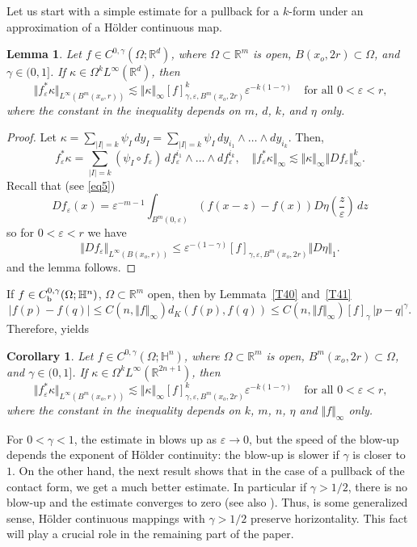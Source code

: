 \documentclass[intlimits,12pt,reqno]{amsart}
\newcommand{\bbbr}{\mathbb R}
\newcommand{\bbbh}{\mathbb H}
\newcommand{\R}{\mathbb R}
\newcommand{\eps}{\varepsilon}
\numberwithin{equation}{section}
\newtheorem{lemma}[theorem]{Lemma}
\newtheorem{corollary}[theorem]{Corollary}
\theoremstyle{definition}
\begin{document}
Let us start with a simple estimate for a pullback for a $k$-form under an approximation of a H\"older continuous map.
\begin{lemma}
\label{T8}
Let $f\in C^{0,\gamma}(\Omega;\bbbr^d)$, where $\Omega\subset\R^m$ is open, $B(x_o,2r)\subset\Omega$, and $\gamma\in(0,1]$.  
If $\kappa\in \Omega^k L^\infty(\bbbr^d)$, then 
$$
\Vert f_\eps^*\kappa\Vert_{L^\infty(B^m(x_o,r))}\lesssim \Vert\kappa\Vert_{\infty}[f]_{\gamma,\eps,B^m(x_o,2r)}^k \eps^{-k(1-\gamma)}
\quad
\text{for all $0<\eps<r$,}
$$
where the constant in the inequality depends on $m$, $d$, $k$, and $\eta$ only.
\end{lemma}
\begin{proof}
Let $\kappa=\sum_{|I|=k}\psi_I\, dy_I=\sum_{|I|=k}\psi_I\, dy_{i_1}\wedge\ldots\wedge dy_{i_k}$. Then,
$$
f_\eps^*\kappa = \sum_{|I|=k}(\psi_I\circ f_\eps)\, df_\eps^{i_1}\wedge\ldots\wedge df_\eps^{i_k},
\quad
\Vert f_\eps^*\kappa\Vert_\infty\lesssim \Vert\kappa\Vert_\infty\Vert Df_\eps\Vert_\infty^k.
$$
Recall that (see \eqref{eq5}) 
$$
D f_\eps(x) = \eps^{-m-1}\int_{B^m(0,\eps)} (f(x-z)-f(x))D\eta\left(\frac{z}{\eps}\right)\, dz
$$
so for $0<\eps<r$ we have
\begin{equation}
\label{eq163}
\Vert D f_\eps\Vert_{L^\infty(B(x_o,r))}\leq
\eps^{-(1-\gamma)} [f]_{\gamma,\eps,B^m(x_o,2r)}\Vert D\eta\Vert_1.
\end{equation}
and the lemma follows.
\end{proof}
If $f\in C_{\rm b}^{0,\gamma}(\Omega;\bbbh^n)$, $\Omega\subset\R^m$ open, then by Lemmata~\ref{T40} and~\ref{T41} 
\begin{equation}
\label{eq30}
|f(p)-f(q)|\leq C(n,\Vert f\Vert_\infty) d_K(f(p),f(q))\leq C(n,\Vert f\Vert_\infty) [f]_{\gamma}\, |p-q|^\gamma.
\end{equation}
Therefore,  yields
\begin{corollary}
\label{T46}
Let $f\in C^{0,\gamma}(\Omega;\bbbh^n)$, where $\Omega\subset\R^m$ is open, $B^m(x_o,2r)\subset\Omega$, and $\gamma\in (0,1]$.
If $\kappa\in \Omega^kL^\infty(\bbbr^{2n+1})$, then 
$$
\Vert f_\eps^*\kappa\Vert_{L^\infty(B^m(x_o,r))}\lesssim \Vert\kappa\Vert_{\infty}[f]_{\gamma,\eps,B^m(x_o,2r)}^k \eps^{-k(1-\gamma)}
\quad
\text{for all $0<\eps<r$,}
$$
where the constant in the inequality depends on $k$, $m$, $n$, $\eta$ and $\Vert f\Vert_\infty$ only.
\end{corollary}
For $0<\gamma<1$, the estimate in  blows up as $\eps\to 0$, but the speed of the blow-up depends the exponent of H\"older continuity: 
the blow-up is slower if $\gamma$ is closer to $1$.
On the other hand, the next result shows that in the case of a pullback of the contact form, we get a much better estimate. In particular if $\gamma>1/2$, there is no blow-up and the estimate converges to zero (see also ). Thus, is some generalized sense, H\"older continuous mappings with $\gamma>1/2$
preserve horizontality. This fact will play a crucial role in the remaining part of the paper.
\end{document}
